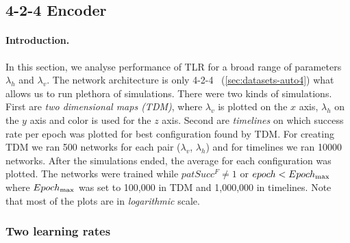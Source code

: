 

\subsection{4-2-4 Encoder} 
\label{sec:results-auto4} 

\paragraph{Introduction.} 
\label{sec:results-auto4-introduction} 
In this section, we analyse performance of TLR for a broad range of parameters $\lambda_h$ and $\lambda_v$. The network architecture is only 4-2-4~
(\ref{sec:datasets-auto4}) what allows us to run plethora of simulations. There were two kinds of simulations. First are \emph{two dimensional maps (TDM)}, where $\lambda_v$ is plotted on the $x$ axis, $\lambda_h$ on the $y$ axis and color is used for the $z$ axis. Second are \emph{timelines}  on which success rate per epoch was plotted for best configuration found by TDM. For creating TDM we ran 500 networks for each pair ($\lambda_v$, $\lambda_h$) and for timelines we ran 10000 networks. After the simulations ended, the average for each configuration was plotted. The networks were trained while $patSucc^F \neq 1$ or $epoch < Epoch_{\rm max}$ where $Epoch_{\rm max}$ was set to 100,000 in TDM and 1,000,000 in timelines. Note that most of the plots are in \emph{logarithmic} scale. 

 

\subsubsection{Two learning rates} 
\label{sec:tlr-auto4}

